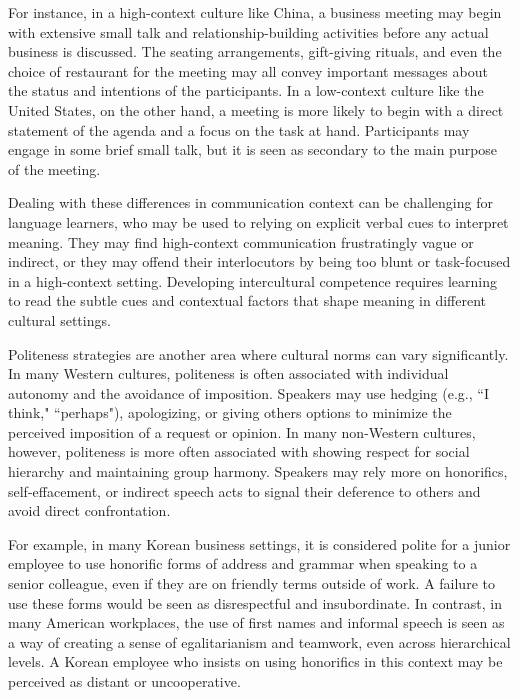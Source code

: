 For instance, in a high-context culture like China, a business meeting may begin with extensive small talk and relationship-building activities before any actual business is discussed. The seating arrangements, gift-giving rituals, and even the choice of restaurant for the meeting may all convey important messages about the status and intentions of the participants. In a low-context culture like the United States, on the other hand, a meeting is more likely to begin with a direct statement of the agenda and a focus on the task at hand. Participants may engage in some brief small talk, but it is seen as secondary to the main purpose of the meeting.

Dealing with these differences in communication context can be challenging for language learners, who may be used to relying on explicit verbal cues to interpret meaning. They may find high-context communication frustratingly vague or indirect, or they may offend their interlocutors by being too blunt or task-focused in a high-context setting. Developing intercultural competence requires learning to read the subtle cues and contextual factors that shape meaning in different cultural settings.

Politeness strategies are another area where cultural norms can vary significantly. In many Western cultures, politeness is often associated with individual autonomy and the avoidance of imposition. Speakers may use hedging (e.g., ``I think," ``perhaps"), apologizing, or giving others options to minimize the perceived imposition of a request or opinion. In many non-Western cultures, however, politeness is more often associated with showing respect for social hierarchy and maintaining group harmony. Speakers may rely more on honorifics, self-effacement, or indirect speech acts to signal their deference to others and avoid direct confrontation.

For example, in many Korean business settings, it is considered polite for a junior employee to use honorific forms of address and grammar when speaking to a senior colleague, even if they are on friendly terms outside of work. A failure to use these forms would be seen as disrespectful and insubordinate. In contrast, in many American workplaces, the use of first names and informal speech is seen as a way of creating a sense of egalitarianism and teamwork, even across hierarchical levels. A Korean employee who insists on using honorifics in this context may be perceived as distant or uncooperative.

